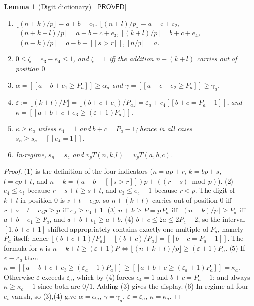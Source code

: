 \documentclass[11pt,reqno]{amsart}
\theoremstyle{plain}
\newtheorem{lemma}[theorem]{Lemma}
\theoremstyle{definition}
\theoremstyle{remark}
\numberwithin{equation}{section}
\newcommand{\ii}[1]{[\![#1]\!]}
\newcommand{\PROVED}{\textsf{[PROVED]}}
\begin{document}
\begin{lemma}[Digit dictionary]\label{lem:D1}
$\PROVED$
\begin{enumerate}[leftmargin=1.9em,label=\textup{(\arabic*)}]
\item $\lfloor(n+k)/p\rfloor=a+b+e_1$, $\lfloor(n+l)/p\rfloor=a+c+e_2$,
  $\lfloor(n+k+l)/p\rfloor=a+b+c+e_3$, $\lfloor(k+l)/p\rfloor=b+c+e_4$,
  $\lfloor(n-k)/p\rfloor=a-b-\ii{s>r}$, $\lfloor n/p\rfloor=a$.
\item $0\le\zeta=e_3-e_4\le1$, and $\zeta=1$ iff the addition $n+(k+l)$ carries out of
  position $0$.
\item $\alpha=\ii{a+b+e_1\ge P_a}\ge\alpha_a$ and $\gamma=\ii{a+c+e_2\ge P_a}\ge\gamma_a$.
\item $\varepsilon:=\lfloor(k+l)/P\rfloor=\lfloor(b+c+e_4)/P_a\rfloor
  =\varepsilon_a+e_4\ii{b+c=P_a-1}$, and $\kappa=\ii{a+b+c+e_3\ge(\varepsilon+1)P_a}$.
\item $\kappa\ge\kappa_a$ \emph{unless} $e_4=1$ and $b+c=P_a-1$; hence in all cases
  $s_n\ge s_a-\ii{e_4=1}$.
\item In-regime, $s_n=s_a$ and $v_pT(n,k,l)=v_pT(a,b,c)$.
\end{enumerate}
\end{lemma}

\begin{proof}
(1) is the definition of the four indicators ($n=ap+r$, $k=bp+s$, $l=cp+t$, and
$n-k=(a-b-\ii{s>r})p+((r-s)\bmod p)$).
(2) $e_4\le e_3$ because $r+s+t\ge s+t$, and $e_3\le e_4+1$ because $r<p$. The digit of $k+l$
in position $0$ is $s+t-e_4p$, so $n+(k+l)$ carries out of position $0$ iff
$r+s+t-e_4p\ge p$ iff $e_3\ge e_4+1$.
(3) $n+k\ge P=p\,P_a$ iff $\lfloor(n+k)/p\rfloor\ge P_a$ iff $a+b+e_1\ge P_a$, and
$a+b+e_1\ge a+b$.
(4) $b+c\le2a\le2P_a-2$, so the interval $[1,b+c+1]$ shifted appropriately contains exactly one
multiple of $P_a$, namely $P_a$ itself; hence
$\lfloor(b+c+1)/P_a\rfloor-\lfloor(b+c)/P_a\rfloor=\ii{b+c=P_a-1}$. The formula for $\kappa$ is
$n+k+l\ge(\varepsilon+1)P\iff\lfloor(n+k+l)/p\rfloor\ge(\varepsilon+1)P_a$.
(5) If $\varepsilon=\varepsilon_a$ then
$\kappa=\ii{a+b+c+e_3\ge(\varepsilon_a+1)P_a}\ge\ii{a+b+c\ge(\varepsilon_a+1)P_a}=\kappa_a$.
Otherwise $\varepsilon$ exceeds $\varepsilon_a$, which by (4) forces $e_4=1$ and $b+c=P_a-1$;
and always $\kappa\ge\kappa_a-1$ since both are $0/1$. Adding (3) gives the display.
(6) In-regime all four $e_i$ vanish, so (3),(4) give $\alpha=\alpha_a$, $\gamma=\gamma_a$,
$\varepsilon=\varepsilon_a$, $\kappa=\kappa_a$.
\end{proof}
\end{document}
